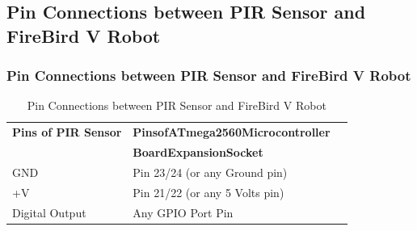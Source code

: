 \documentclass[table,10pt,red]{beamer}	%
\begin{document}
\subsection{Pin Connections between PIR Sensor and FireBird V Robot} %
\begin{frame}
\frametitle{Pin Connections between PIR Sensor and FireBird V Robot}
\pause
\begin{table}
\begin{tabular}{l l l}
\toprule
\textbf{Pins of PIR Sensor} & \textbf{PinsofATmega2560Microcontroller} \\
\textbf{} & \textbf{BoardExpansionSocket} \\
\midrule
GND & Pin 23/24 (or any Ground pin)\\
+V & Pin 21/22 (or any 5 Volts pin) \\
Digital Output & Any GPIO Port Pin\\
\bottomrule
\end{tabular}
\caption{Pin Connections between PIR Sensor and FireBird V Robot}
\end{table}
\end{frame}
\end{document}
